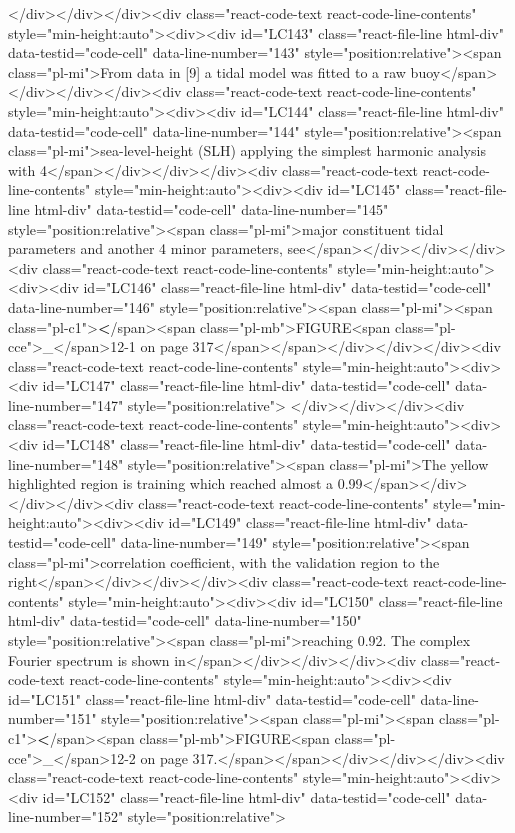 {{</div></div></div><div class="react-code-text react-code-line-contents" style="min-height:auto"><div><div id="LC143" class="react-file-line html-div" data-testid="code-cell" data-line-number="143" style="position:relative"><span class="pl-mi">From data in {[}9{]} a tidal model was fitted to a raw buoy</span></div></div></div><div class="react-code-text react-code-line-contents" style="min-height:auto"><div><div id="LC144" class="react-file-line html-div" data-testid="code-cell" data-line-number="144" style="position:relative"><span class="pl-mi">sea-level-height (SLH) applying the simplest harmonic analysis with 4</span></div></div></div><div class="react-code-text react-code-line-contents" style="min-height:auto"><div><div id="LC145" class="react-file-line html-div" data-testid="code-cell" data-line-number="145" style="position:relative"><span class="pl-mi">major constituent tidal parameters and another 4 minor parameters, see</span></div></div></div><div class="react-code-text react-code-line-contents" style="min-height:auto"><div><div id="LC146" class="react-file-line html-div" data-testid="code-cell" data-line-number="146" style="position:relative"><span class="pl-mi"><span class="pl-c1">\textbf</span>{<span class="pl-mb">FIGURE<span class="pl-cce">\_</span>12-1 on page 317</span>}</span></div></div></div><div class="react-code-text react-code-line-contents" style="min-height:auto"><div><div id="LC147" class="react-file-line html-div" data-testid="code-cell" data-line-number="147" style="position:relative">
</div></div></div><div class="react-code-text react-code-line-contents" style="min-height:auto"><div><div id="LC148" class="react-file-line html-div" data-testid="code-cell" data-line-number="148" style="position:relative"><span class="pl-mi">The yellow highlighted region is training which reached almost a 0.99</span></div></div></div><div class="react-code-text react-code-line-contents" style="min-height:auto"><div><div id="LC149" class="react-file-line html-div" data-testid="code-cell" data-line-number="149" style="position:relative"><span class="pl-mi">correlation coefficient, with the validation region to the right</span></div></div></div><div class="react-code-text react-code-line-contents" style="min-height:auto"><div><div id="LC150" class="react-file-line html-div" data-testid="code-cell" data-line-number="150" style="position:relative"><span class="pl-mi">reaching 0.92. The complex Fourier spectrum is shown in</span></div></div></div><div class="react-code-text react-code-line-contents" style="min-height:auto"><div><div id="LC151" class="react-file-line html-div" data-testid="code-cell" data-line-number="151" style="position:relative"><span class="pl-mi"><span class="pl-c1">\textbf</span>{<span class="pl-mb">FIGURE<span class="pl-cce">\_</span>12-2 on page 317.</span>}</span></div></div></div><div class="react-code-text react-code-line-contents" style="min-height:auto"><div><div id="LC152" class="react-file-line html-div" data-testid="code-cell" data-line-number="152" style="position:relative">
}}
